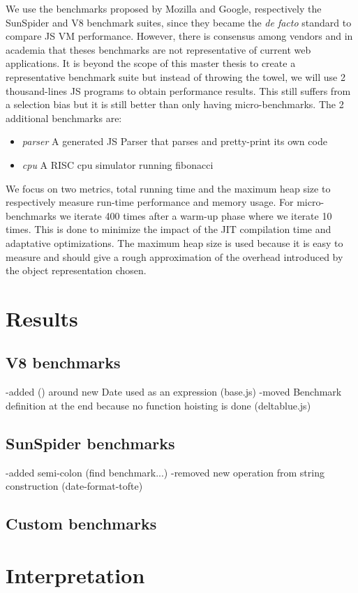 We use the benchmarks proposed by Mozilla and Google, respectively the
SunSpider and V8 benchmark suites, since they became the \textit{de facto}
standard to compare JS VM performance. However, there is consensus among
vendors and in academia that theses benchmarks are not representative of
current web applications. It is beyond the scope of this master thesis to
create a representative benchmark suite but instead of throwing the towel, we
will use 2 thousand-lines JS programs to obtain performance results. This still
suffers from a selection bias but it is still better than only having
micro-benchmarks. The 2 additional benchmarks are:
\begin{itemize}
    \item \textit{parser} A generated JS Parser that parses and pretty-print its own code
    \item \textit{cpu} A RISC cpu simulator running fibonacci
\end{itemize}

We focus on two metrics, total running time and the maximum heap size to
respectively measure run-time performance and memory usage. For
micro-benchmarks we iterate 400 times after a warm-up phase where we iterate 10
times. This is done to minimize the impact of the JIT compilation time and
adaptative optimizations. The maximum heap size is used because it is easy to
measure and should give a rough approximation of the overhead introduced by the
object representation chosen.

\section{Results}

\subsection{V8 benchmarks}
-added () around new Date used as an expression (base.js)
-moved Benchmark definition at the end because no function hoisting is done (deltablue.js)

\subsection{SunSpider benchmarks}
-added semi-colon (find benchmark...)
-removed new operation from string construction (date-format-tofte)

\subsection{Custom benchmarks}

\section{Interpretation}

